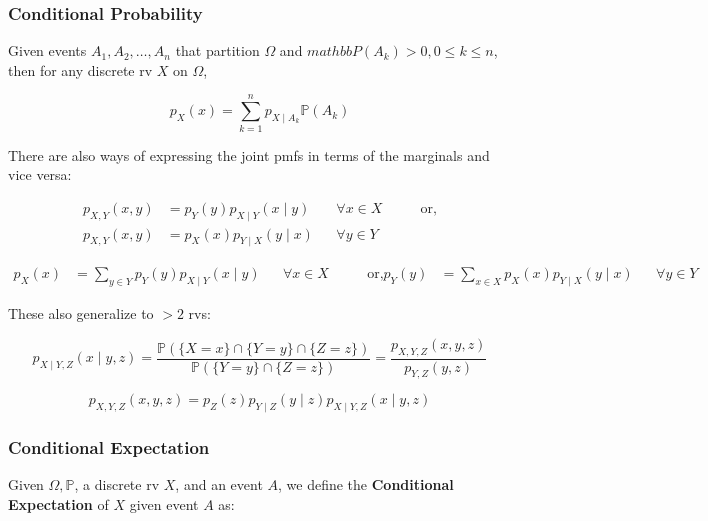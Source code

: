 \documentclass{article}
\begin{document}
\subsubsection{Conditional Probability}

Given events $A_1, A_2, \dots, A_n$ that partition $\Omega$ and
$mathbb{P}(A_k) > 0, 0 \leq k \leq n$, then for any discrete rv $X$ on
$\Omega$,

\begin{equation}
  \tag{Conditional Total Probability}
  \boxed{
    p_X(x) = \sum_{k=1}^n p_{X \mid A_k} \mathbb{P}(A_k)
  }
\end{equation}

There are also ways of expressing the joint pmfs in terms of the
marginals and vice versa:

\begin{equation}
  \tag{Product Rule of Sorts}
  \boxed{
    \begin{aligned}
      p_{X,Y}(x,y)
      &= p_Y(y) p_{X\mid Y}(x\mid y)
      && \forall x \in X
      &&& \text{ or,} \\
      p_{X,Y}(x,y)
      &= p_X(x) p_{Y\mid X}(y\mid x)
      && \forall y \in Y
    \end{aligned}
  }
\end{equation}

\begin{equation}
  \tag{Total-Prob Rule of Sorts}
  \boxed{
    \begin{aligned}
      p_X(x)
      &= \sum_{y \in Y} p_Y(y) p_{X\mid Y}(x \mid y)
      && \forall x \in X
      &&& \text{ or,}
      p_Y(y)
      &= \sum_{x \in X} p_X(x) p_{Y \mid X} (y\mid x)
      && \forall y \in Y
    \end{aligned}
  }
\end{equation}

These also generalize to $> 2$ rvs:

\[
  p_{X\mid Y,Z}(x\mid y,z) = \frac{\mathbb{P}(\{X=x\} \cap \{Y=y\}
    \cap \{Z = z\})} {\mathbb{P}(\{Y=y\} \cap \{Z=z\})} =
  \frac{p_{X,Y,Z} (x,y,z)} {p_{Y,Z}(y,z)}
\]

\[
  p_{X,Y,Z}(x,y,z) = p_Z(z) p_{Y \mid Z}(y\mid z) p_{X\mid Y,Z} (x
  \mid y,z)
\]

\subsubsection{Conditional Expectation}

Given $\Omega, \mathbb{P}$, a discrete rv $X$, and an event $A$, we
define the \textbf{Conditional Expectation} of $X$ given event $A$ as:
\end{document}
